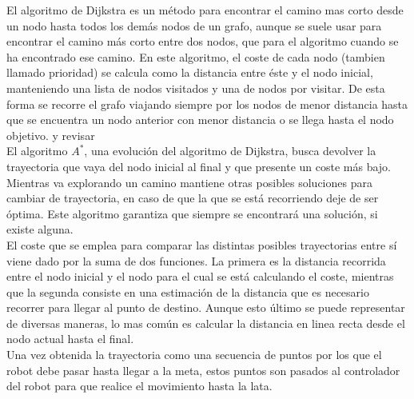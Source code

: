 El algoritmo de Dijkstra  es un método para encontrar el camino mas corto desde un nodo hasta todos los demás nodos de un grafo, aunque se suele usar para encontrar el camino más corto entre dos nodos, que para el algoritmo cuando se ha encontrado ese camino. En este algoritmo, el coste de cada nodo (tambien llamado prioridad) se calcula como la distancia entre éste y el nodo inicial, manteniendo una lista de nodos visitados y una de nodos por visitar. De esta forma se recorre el grafo viajando siempre por los nodos de menor distancia hasta que se encuentra un nodo anterior con menor distancia o se llega hasta el nodo objetivo. y revisar \\

El algoritmo $A^*$, una evolución del algoritmo de Dijkstra, busca devolver la trayectoria que vaya del nodo inicial al final y que presente un coste más bajo. Mientras va explorando un camino mantiene otras posibles soluciones para cambiar de trayectoria, en caso de que la que se está recorriendo deje de ser óptima. Este algoritmo garantiza que siempre se encontrará una solución, si existe alguna.\\

El coste que se emplea para comparar las distintas posibles trayectorias entre sí viene dado por la suma de dos funciones. La primera es la distancia recorrida entre el nodo inicial y el nodo para el cual se está calculando el coste, mientras que la segunda consiste en una estimación de la distancia que es necesario recorrer para llegar al punto de destino. Aunque esto último se puede representar de diversas maneras, lo mas común es calcular la distancia en linea recta desde el nodo actual hasta el final.\\

Una vez obtenida la trayectoria como una secuencia de puntos por los que el robot debe pasar hasta llegar a la meta, estos puntos son pasados al controlador del robot para que realice el movimiento hasta la lata.\\